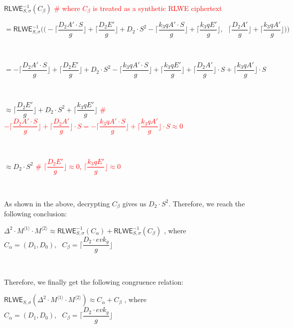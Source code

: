 \noindent $\textsf{RLWE}^{-1}_{S, \sigma}(C_\beta)$ \textcolor{red}{\text{ } \# where $C_\beta$ is treated as a synthetic RLWE ciphertext}

\noindent $=  \textsf{RLWE}^{-1}_{S, \sigma}\Bigg( \Bigg(-\Bigg\lceil\dfrac{D_2A'\cdot S}{g}\Bigg\rfloor + \Bigg\lceil\dfrac{D_2E'}{g}\Bigg\rfloor + D_2\cdot S^2
-\Bigg\lceil\dfrac{k_3qA'\cdot S}{g}\Bigg\rfloor + \Bigg\lceil\dfrac{k_3qE'}{g}\Bigg\rfloor, \text{ } \Bigg\lceil\dfrac{D_2A'}{g}\Bigg\rfloor +\Bigg\lceil\dfrac{k_3qA'}{g}\Bigg\rfloor\Bigg)\Bigg)$

$ $

\noindent $=  -\Bigg\lceil\dfrac{D_2A'\cdot S}{g}\Bigg\rfloor + \Bigg\lceil\dfrac{D_2E'}{g}\Bigg\rfloor + D_2\cdot S^2
-\Bigg\lceil\dfrac{k_3qA'\cdot S}{g}\Bigg\rfloor + \Bigg\lceil\dfrac{k_3qE'}{g}\Bigg\rfloor + \Bigg\lceil\dfrac{D_2A'}{g}\Bigg\rfloor\cdot S + \Bigg\lceil\dfrac{k_3qA'}{g}\Bigg\rfloor\cdot S$

$ $

\noindent $\approx \Bigg\lceil\dfrac{D_2E'}{g}\Bigg\rfloor + D_2\cdot S^2
 + \Bigg\lceil\dfrac{k_3qE'}{g}\Bigg\rfloor$ \textcolor{red}{\text{ } \# $-\Bigg\lceil\dfrac{D_2A'\cdot S}{g}\Bigg\rfloor + \Bigg\lceil\dfrac{D_2A'}{g}\Bigg\rfloor\cdot S = -\Bigg\lceil\dfrac{k_3qA'\cdot S}{g}\Bigg\rfloor + \Bigg\lceil\dfrac{k_3qA'}{g}\Bigg\rfloor\cdot S \approx 0$}

$ $

\noindent $\approx D_2\cdot S^2$ \textcolor{red}{\text{ } \# 
  $\Bigg\lceil\dfrac{D_2E'}{g}\Bigg\rfloor \approx 0$, \text{ } $\Bigg\lceil\dfrac{k_3qE'}{g}\Bigg\rfloor \approx 0$}


$ $

As shown in the above, decrypting $C_\beta$ gives us $D_2\cdot S^2$. Therefore, we reach the following conclusion: 

$\Delta^2 \cdot M^{\langle 1 \rangle} \cdot M^{\langle 2 \rangle} \approx \textsf{RLWE}^{-1}_{S, \sigma}(C_\alpha) + \textsf{RLWE}^{-1}_{S, \sigma}(C_\beta)$ \text{ } , where $C_\alpha = (D_1, D_0), \text{ } C_\beta = \Bigg\lceil\dfrac{D_2 \cdot \mathit{evk_g}}{g}\Bigg\rfloor$

$ $

Therefore, we finally get the following congruence relation:

$\textsf{RLWE}_{S, \sigma}(\Delta^2 \cdot M^{\langle 1 \rangle} \cdot M^{\langle 2 \rangle}) \approx C_\alpha + C_\beta$ \text{ } , where $C_\alpha = (D_1, D_0), \text{ } C_\beta = \Bigg\lceil\dfrac{D_2 \cdot \mathit{evk_g}}{g}\Bigg\rfloor$

